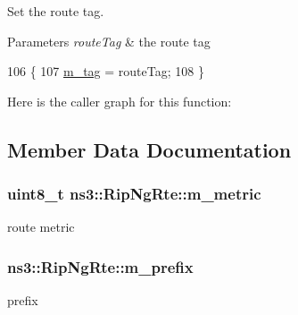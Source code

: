 Set the route tag. 


\begin{DoxyParams}{Parameters}
{\em route\+Tag} & the route tag \\
\hline
\end{DoxyParams}

\begin{DoxyCode}
106 \{
107   \hyperlink{classns3_1_1RipNgRte_a02e9a9a0a844f09441d19418c434acf6}{m\_tag} = routeTag;
108 \}
\end{DoxyCode}


Here is the caller graph for this function\+:




\subsection{Member Data Documentation}
\subsubsection[{\texorpdfstring{m\+\_\+metric}{m_metric}}]{\setlength{\rightskip}{0pt plus 5cm}uint8\+\_\+t ns3\+::\+Rip\+Ng\+Rte\+::m\+\_\+metric\hspace{0.3cm}{\ttfamily [private]}}\hypertarget{classns3_1_1RipNgRte_a094b76991347ede6defef62080acb458}{}\label{classns3_1_1RipNgRte_a094b76991347ede6defef62080acb458}


route metric 

\subsubsection[{\texorpdfstring{m\+\_\+prefix}{m_prefix}}]{ ns3\+::\+Rip\+Ng\+Rte\+::m\+\_\+prefix\hspace{0.3cm}{\ttfamily [private]}}\hypertarget{classns3_1_1RipNgRte_a09ae226e8d0712bbe7803b9bede0cf84}{}\label{classns3_1_1RipNgRte_a09ae226e8d0712bbe7803b9bede0cf84}


prefix 

